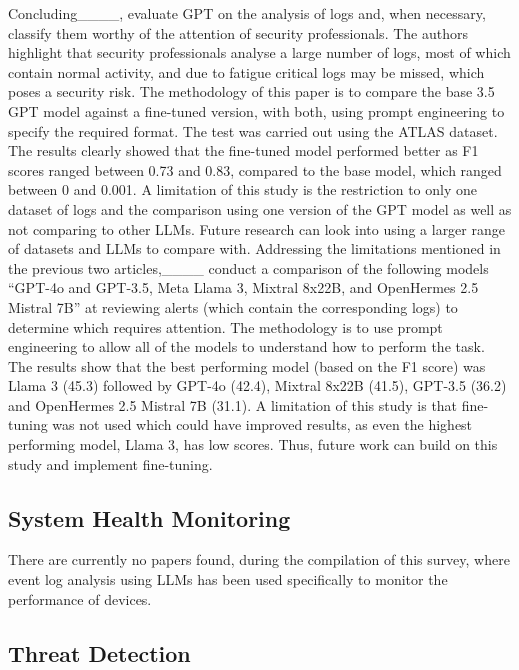 Concluding____, evaluate GPT on the analysis of logs and, when necessary, classify them worthy of the attention of security professionals. The authors highlight that security professionals analyse a large number of logs, most of which contain normal activity, and due to fatigue critical logs may be missed, which poses a security risk. The methodology of this paper is to compare the base 3.5 GPT model against a fine-tuned version, with both, using prompt engineering to specify the required format. The test was carried out using the ATLAS dataset. The results clearly showed that the fine-tuned model performed better as F1 scores ranged between 0.73 and 0.83, compared to the base model, which ranged between 0 and 0.001. A limitation of this study is the restriction to only one dataset of logs and the comparison using one version of the GPT model as well as not comparing to other LLMs. Future research can look into using a larger range of datasets and LLMs to compare with. Addressing the limitations mentioned in the previous two articles,____ conduct a comparison of the following models ``GPT-4o and GPT-3.5, Meta Llama 3, Mixtral 8x22B, and OpenHermes 2.5 Mistral 7B'' at reviewing alerts (which contain the corresponding logs) to determine which requires attention. The methodology is to use prompt engineering to allow all of the models to understand how to perform the task. The results show that the best performing model (based on the F1 score) was Llama 3 (45.3) followed by GPT-4o (42.4), Mixtral 8x22B (41.5), GPT-3.5 (36.2) and OpenHermes 2.5 Mistral 7B (31.1). A limitation of this study is that fine-tuning was not used which could have improved results, as even the highest performing model, Llama 3, has low scores. Thus, future work can build on this study and implement fine-tuning.

\subsection{System Health Monitoring}
There are currently no papers found, during the compilation of this survey, where event log analysis using LLMs has been used specifically to monitor the performance of devices.

\subsection{Threat Detection}
